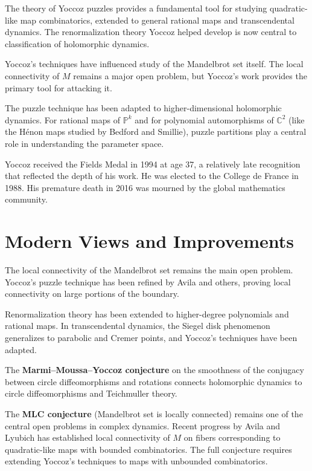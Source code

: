 The theory of Yoccoz puzzles provides a fundamental tool for
studying quadratic-like map combinatorics, extended to general
rational maps and transcendental dynamics.  The renormalization
theory Yoccoz helped develop is now central to classification of
holomorphic dynamics.

Yoccoz's techniques have influenced study of the Mandelbrot set
itself.  The local connectivity of $M$ remains a major open
problem, but Yoccoz's work provides the primary tool for attacking
it.

The puzzle technique has been adapted to higher-dimensional
holomorphic dynamics.  For rational maps of $\mathbb{P}^k$ and for
polynomial automorphisms of $\mathbb{C}^2$ (like the H\'enon maps
studied by Bedford and Smillie), puzzle partitions play a central
role in understanding the parameter space.

Yoccoz received the Fields Medal in 1994 at age 37, a relatively
late recognition that reflected the depth of his work.  He was
elected to the College de France in 1988.  His premature death in
2016 was mourned by the global mathematics community.

\section{Modern Views and Improvements}

The local connectivity of the Mandelbrot set remains the main open
problem.  Yoccoz's puzzle technique has been refined by Avila and
others, proving local connectivity on large portions of the
boundary.

Renormalization theory has been extended to higher-degree
polynomials and rational maps.  In transcendental dynamics, the
Siegel disk phenomenon generalizes to parabolic and Cremer points,
and Yoccoz's techniques have been adapted.

The \textbf{Marmi--Moussa--Yoccoz conjecture} on the smoothness of
the conjugacy between circle diffeomorphisms and rotations connects
holomorphic dynamics to circle diffeomorphisms and Teichmuller
theory.

The \textbf{MLC conjecture} (Mandelbrot set is locally connected)
remains one of the central open problems in complex dynamics.
Recent progress by Avila and Lyubich has established local
connectivity of $M$ on fibers corresponding to quadratic-like maps
with bounded combinatorics.  The full conjecture requires extending
Yoccoz's techniques to maps with unbounded combinatorics.

